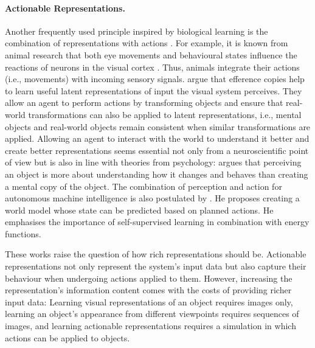 \paragraph{Actionable Representations.} Another frequently used principle inspired by biological learning is the combination of representations with actions \cite{knoblich_social_2006, zhou_does_2019}. For example, it is known from animal research that both eye movements and behavioural states influence the reactions of neurons in the visual cortex .
Thus, animals integrate their actions (i.e., movements) with incoming sensory signals.
 argue that efference copies help to learn useful latent representations of input the visual system perceives. They allow an agent to perform actions by transforming objects and ensure that real-world transformations can also be applied to latent representations, i.e., mental objects and real-world objects remain consistent when similar transformations are applied.
Allowing an agent to interact with the world to understand it better and create better representations seems essential not only from a neuroscientific point of view but is also in line with theories from psychology:
 argues that perceiving an object is more about understanding how it changes and behaves than creating a mental copy of the object.
The combination of perception and action for autonomous machine intelligence is also postulated by . He proposes creating a world model whose state can be predicted based on planned actions. He emphasises the importance of self-supervised learning in combination with energy functions.

These works raise the question of how rich representations should be. Actionable representations not only represent the system's input data but also capture their behaviour when undergoing actions applied to them. However, increasing the representation's information content comes with the costs of providing richer input data: Learning visual representations of an object requires images only, learning an object's appearance from different viewpoints requires sequences of images, and learning actionable representations requires a simulation in which actions can be applied to objects. 


